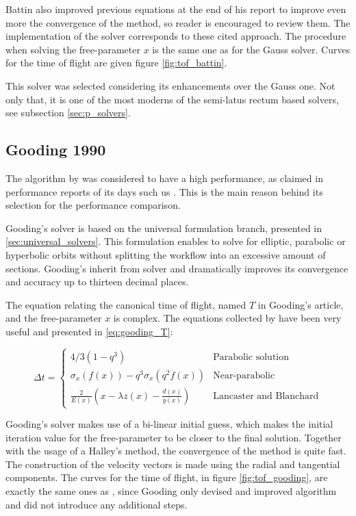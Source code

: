 Battin also improved previous equations at the end of his report to improve even
more the convergence of the method, so reader is encouraged to review them. The
implementation of the solver corresponds to these cited approach. The procedure
when solving the free-parameter $x$ is the same one as for the Gauss solver.
Curves for the time of flight are given figure \ref{fig:tof_battin}.

This solver was selected considering its enhancements over the Gauss one. Not
only that, it is one of the most moderns of the semi-latus rectum based solvers,
see subsection \ref{sec:p_solvers}.


\subsection{Gooding 1990}

The algorithm by \cite{gooding1990} was considered to have a high performance,
as claimed in performance reports of its days such us \cite{klumpp1999}. This is
the main reason behind its selection for the performance comparison.

Gooding's solver is based on the universal formulation branch, presented in
\ref{sec:universal_solvers}. This formulation enables to solve for elliptic,
parabolic or hyperbolic orbits without splitting the workflow into an excessive
amount of sections. Gooding's inherit from \cite{lancaster1970} solver and
dramatically improves its convergence and accuracy up to thirteen decimal
places.

The equation relating the canonical time of flight, named $T$ in Gooding's
article, and the free-parameter $x$ is complex. The equations collected by
\cite{torre2015} have been very useful and presented in \ref{eq:gooding_T}:

\begin{equation}
  \Delta t =
  \begin{cases}
    4/3(1 - q^3)                                                    & \text{Parabolic solution}      \\
    \sigma_x(f(x)) - q^3\sigma_x(q^2f(x))                           & \text{Near-parabolic}          \\
    \frac{2}{E(x)}\left(x - \lambda z(x) - \frac{d(x)}{y(x)}\right) & \text{Lancaster and Blanchard}
  \end{cases}
  \label{eq:gooding_T}
\end{equation}

Gooding's solver makes use of a bi-linear initial guess, which makes the initial
iteration value for the free-parameter to be closer to the final solution.
Together with the usage of a Halley's method, the convergence of the method is
quite fast. The construction of the velocity vectors is made using the radial
and tangential components. The curves for the time of flight, in figure
\ref{fig:tof_gooding}, are exactly the same ones as \cite{lancaster1970}, since
Gooding only devised and improved algorithm and did not introduce any additional
steps.

